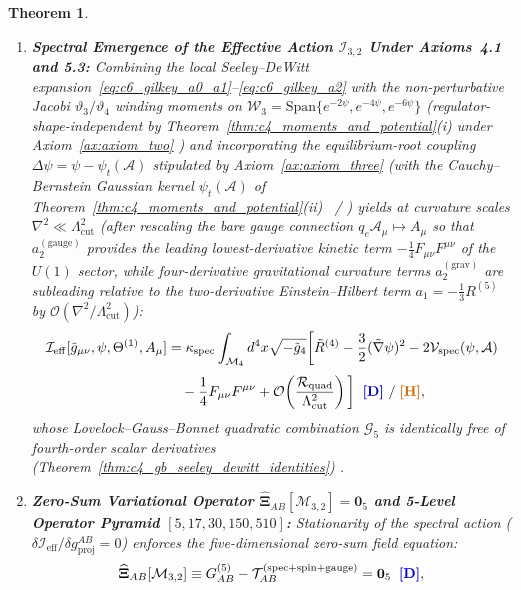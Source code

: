\documentclass[11pt,a4paper]{article}
\newcommand{\catD}{\text{\textbf{\textcolor{blue!75!black}{[D]}}}}
\newcommand{\catH}{\text{\textbf{\textcolor{orange!80!black}{[H]}}}}
\theoremstyle{definition}
\theoremstyle{plain}
\newtheorem{theorem}[axiom]{Theorem}
\theoremstyle{remark}
\begin{document}
\begin{theorem}
\begin{enumerate}[label=(\roman*)]
  \item \textbf{Spectral Emergence of the Effective Action $\mathcal{I}_{3,2}$ Under Axioms~4.1 and 5.3:}
  Combining the local Seeley--DeWitt expansion~\eqref{eq:c6_gilkey_a0_a1}--\eqref{eq:c6_gilkey_a2} with the non-perturbative Jacobi $\vartheta_3/\vartheta_4$ winding moments on $\mathcal{W}_3 = \mathrm{Span}\{e^{-2\psi}, e^{-4\psi}, e^{-6\psi}\}$ (regulator-shape-independent by Theorem~\ref{thm:c4_moments_and_potential}(i) under Axiom~\ref{ax:axiom_two} \catD) and incorporating the equilibrium-root coupling $\Delta\psi = \psi - \psi_t(\mathcal{A})$ stipulated by Axiom~\ref{ax:axiom_three} (with the Cauchy--Bernstein Gaussian kernel $\psi_t(\mathcal{A})$ of Theorem~\ref{thm:c4_moments_and_potential}(ii) \catD\ / \catH) yields at curvature scales $\nabla^2 \ll \Lambda_{\mathrm{cut}}^2$ (after rescaling the bare gauge connection $q_e\mathcal{A}_\mu \mapsto A_\mu$ so that $a_2^{(\mathrm{gauge})}$ provides the leading lowest-derivative kinetic term $-\frac{1}{4}F_{\mu\nu}F^{\mu\nu}$ of the $U(1)$ sector, while four-derivative gravitational curvature terms $a_2^{(\mathrm{grav})}$ are subleading relative to the two-derivative Einstein--Hilbert term $a_1 = -\frac{1}{3}R^{(5)}$ by $\mathcal{O}(\nabla^2/\Lambda_{\mathrm{cut}}^2)$):
  \begin{align}
  \mathcal{I}_{\mathrm{eff}}[\tilde{g}_{\mu\nu}, \psi, \Theta^{(1)}, A_\mu] &= \kappa_{\mathrm{spec}}\int_{\mathcal{M}_4} d^4x\sqrt{-\tilde{g}_4}\bigg[\tilde{R}^{(4)} - \frac{3}{2}(\tilde{\nabla}\psi)^2 - 2\mathcal{V}_{\mathrm{spec}}(\psi, \mathcal{A}) \nonumber \\[3pt]
  &\quad - \frac{1}{4}F_{\mu\nu}F^{\mu\nu} + \mathcal{O}\!\left(\frac{\mathcal{R}_{\mathrm{quad}}}{\Lambda_{\mathrm{cut}}^2}\right)\bigg] \;\;\catD\ / \;\catH, \label{eq:c6_spectral_action_emergence}
  \end{align}
  whose Lovelock--Gauss--Bonnet quadratic combination $\mathcal{G}_5$ is identically free of fourth-order scalar derivatives (Theorem~\ref{thm:c4_gb_seeley_dewitt_identities}) \catD.
  \item \textbf{Zero-Sum Variational Operator $\widehat{\bm{\Xi}}_{AB}[\mathcal{M}_{3,2}] = \mathbf{0}_5$ and 5-Level Operator Pyramid $[5, 17, 30, 150, 510]$:}
  Stationarity of the spectral action ($\delta\mathcal{I}_{\mathrm{eff}}/\delta g_{\mathrm{proj}}^{AB} = 0$) enforces the five-dimensional zero-sum field equation:
  \begin{align}
  \widehat{\bm{\Xi}}_{AB}[\mathcal{M}_{3,2}] &\equiv G_{AB}^{(5)} - \mathcal{T}_{AB}^{(\mathrm{spec}+\mathrm{spin}+\mathrm{gauge})} = \mathbf{0}_5 \;\;\catD, \label{eq:c6_zero_sum_operator} \\[4pt]

\end{align}
\end{enumerate}
\end{theorem}
\end{document}
